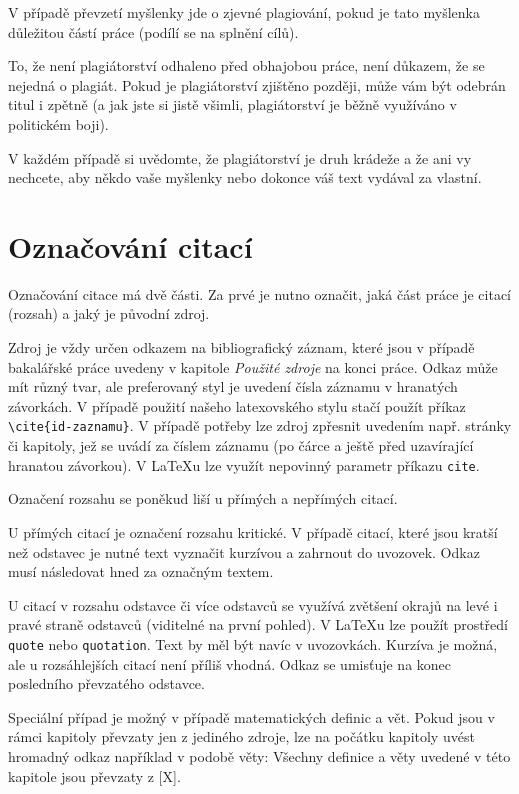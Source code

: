 \documentclass[male,czech,api_bc]{kitheses}
\begin{document}
V případě převzetí myšlenky jde o zjevné plagiování, pokud je tato myšlenka důležitou částí práce (podílí se na splnění cílů). 

To, že není plagiátorství odhaleno před obhajobou práce, není důkazem, že se nejedná o plagiát. Pokud je plagiátorství zjištěno později, může vám být odebrán titul i zpětně (a jak jste si jistě všimli, plagiátorství je běžně využíváno v politickém boji).

V každém případě si uvědomte, že plagiátorství je druh krádeže a že ani vy nechcete, aby někdo vaše myšlenky nebo dokonce váš text vydával za vlastní.

\section{Označování citací}

Označování citace má dvě části. Za prvé je nutno označit, jaká část práce je citací (rozsah) a jaký je původní zdroj. 

Zdroj je vždy určen odkazem na bibliografický záznam, které jsou v případě bakalářské práce uvedeny v kapitole \textit{Použité zdroje} na konci práce. Odkaz může mít různý tvar, ale preferovaný styl je uvedení čísla záznamu v hranatých závorkách. V případě použití našeho latexovského stylu stačí použít příkaz \verb!\cite{id-zaznamu}!. V případě potřeby lze zdroj zpřesnit uvedením např. stránky či kapitoly, jež se uvádí za číslem záznamu (po čárce a ještě před uzavírající hranatou závorkou). V \LaTeX u lze využít nepovinný parametr příkazu \verb!cite!.

Označení rozsahu se poněkud liší u přímých a nepřímých citací.

U přímých citací je označení rozsahu kritické. V případě citací, které jsou kratší než odstavec je nutné text vyznačit kurzívou a zahrnout do uvozovek. Odkaz musí následovat hned za označným textem.

U citací v rozsahu odstavce či více odstavců se využívá zvětšení okrajů na levé i pravé straně odstavců (viditelné na první pohled). V \LaTeX u lze použít prostředí \verb!quote! nebo \verb!quotation!. Text by měl být navíc v uvozovkách. Kurzíva je možná, ale u rozsáhlejších citací není příliš vhodná. Odkaz se umisťuje na konec posledního převzatého odstavce.

Speciální případ je možný v případě matematických definic a vět. Pokud jsou v rámci kapitoly převzaty jen z jediného zdroje, lze na počátku kapitoly uvést hromadný odkaz například v podobě věty: Všechny definice a věty uvedené v této kapitole jsou převzaty z [X].
\end{document}

